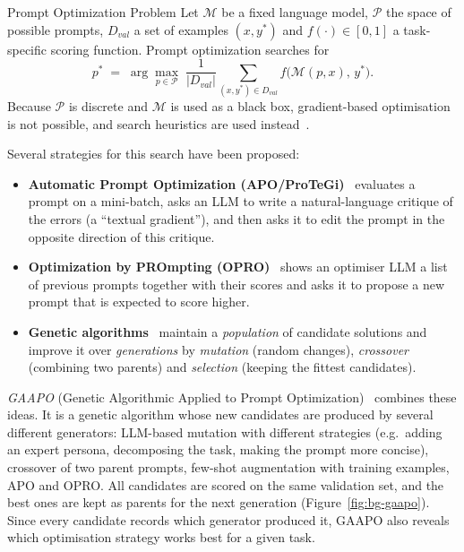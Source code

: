 \begin{bgdefinition}{Prompt Optimization Problem}
Let $\mathcal{M}$ be a fixed language model, $\mathcal{P}$ the space of
possible prompts, $D_{\mathit{val}}$ a set of examples $(x, y^{*})$ and
$f(\cdot) \in [0,1]$ a task-specific scoring function. Prompt optimization
searches for
\[
  p^{*} \;=\; \arg\max_{p \in \mathcal{P}} \;
  \frac{1}{|D_{\mathit{val}}|} \sum_{(x,y^{*}) \in D_{\mathit{val}}}
  f\big(\mathcal{M}(p, x),\, y^{*}\big).
\]
Because $\mathcal{P}$ is discrete and $\mathcal{M}$ is used as a black box,
gradient-based optimisation is not possible, and search heuristics are
used instead~\cite{pryzant2023automatic,yang2024large,secheresse2025gaapo}.
\end{bgdefinition}

Several strategies for this search have been proposed:

\begin{itemize}
  \item \textbf{Automatic Prompt Optimization (APO/ProTeGi)}~\cite{pryzant2023automatic}
        evaluates a prompt on a mini-batch, asks an LLM to write a
        natural-language critique of the errors (a ``textual gradient''), and
        then asks it to edit the prompt in the opposite direction of this
        critique.
  \item \textbf{Optimization by PROmpting (OPRO)}~\cite{yang2024large} shows an
        optimiser LLM a list of previous prompts together with their scores
        and asks it to propose a new prompt that is expected to score higher.
  \item \textbf{Genetic algorithms}~\cite{holland1975adaptation,goldberg1989genetic}
        maintain a \emph{population} of candidate solutions and improve it over
        \emph{generations} by \emph{mutation} (random changes),
        \emph{crossover} (combining two parents) and \emph{selection}
        (keeping the fittest candidates).
\end{itemize}

\emph{GAAPO} (Genetic Algorithmic Applied to Prompt
Optimization)~\cite{secheresse2025gaapo} combines these ideas. It is a
genetic algorithm whose new candidates are produced by several different
generators: LLM-based mutation with different strategies (e.g.\ adding an
expert persona, decomposing the task, making the prompt more concise),
crossover of two parent prompts, few-shot augmentation with training
examples, APO and OPRO. All candidates are scored on the same validation
set, and the best ones are kept as parents for the next generation
(Figure~\ref{fig:bg-gaapo}). Since every candidate records which generator
produced it, GAAPO also reveals which optimisation strategy works best for a
given task.

